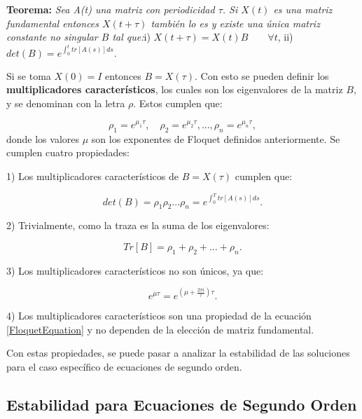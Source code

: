 \documentclass[a4paper,10pt]{report}
\begin{document}
\begin{center}
\textbf{Teorema:} \textit{Sea A(t) una matriz con periodicidad $\tau$. Si $X(t)$ es una matriz fundamental entonces $X(t+\tau)$ también lo es y existe una única matriz constante no singular $B$ tal que:}\linebreak \linebreak i) $X(t+\tau) = X(t)B \qquad\forall t$, \linebreak ii) $det(B) = e^{\int_0^t tr[A(s)]ds}.$
\end{center}Si se toma $X(0)=I$ entonces $B=X(\tau)$. Con esto se pueden definir los \textbf{multiplicadores característicos}, los cuales son los eigenvalores de la matriz $B$, y se denominan con la letra $\rho$. Estos cumplen que:

\begin{equation}
\rho_1 = e^{\mu_1 \tau}, \quad \rho_2 = e^{\mu_2 \tau}, ... , \rho_n = e^{\mu_n \tau},
\end{equation} donde los valores $\mu$ son los exponentes de Floquet definidos anteriormente. Se cumplen cuatro propiedades:

1) Los multiplicadores característicos de $B=X(\tau)$ cumplen que:

\begin{equation}
det(B) = \rho_1 \rho_2 ... \rho_n = e^{\int_0^T tr[A(s)]ds}.
\end{equation}

2) Trivialmente, como la traza es la suma de los eigenvalores:

\begin{equation}
Tr[B] = \rho_1 + \rho_2 + ... + \rho_n.
\end{equation}

3) Los multiplicadores característicos no son únicos, ya que:

\begin{equation}
e^{\mu \tau} = e^{(\mu  +\frac{2\pi i}{\tau} )\tau}.
\end{equation}

4) Los multiplicadores característicos son una propiedad de la ecuación \ref{FloquetEquation} y no dependen de la elección de matriz fundamental.

Con estas propiedades, se puede pasar a analizar la estabilidad de las soluciones para el caso específico de ecuaciones de segundo orden.

\subsection{Estabilidad para Ecuaciones de Segundo Orden}
\end{document}
